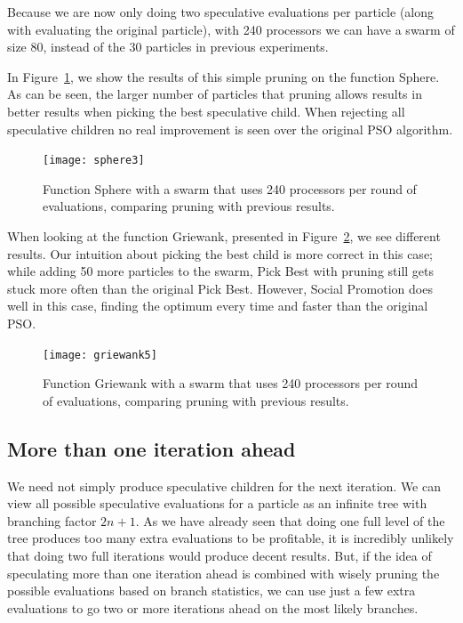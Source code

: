 \documentclass[journal,letterpaper]{IEEEtran}
\newcommand{\fig}[1]{Figure~\ref{fig:#1}}
\begin{document}
Because we are now only doing two speculative evaluations per particle (along
with evaluating the original particle), with 240 processors we can have a swarm
of size 80, instead of the 30 particles in previous experiments.  

In \fig{sphere-pruned}, we show the results of this simple pruning on the
function Sphere.  As can be seen, the larger number of particles that pruning
allows results in better results when picking the best speculative child.  
When rejecting all speculative children no real improvement is seen over the
original PSO algorithm.

\begin{figure}
  \centering
  \texttt{[image: sphere3]}
  \caption{Function Sphere with a swarm that uses 240 processors per round of
  evaluations, comparing pruning with previous results.}
  \label{fig:sphere-pruned}
\end{figure}

When looking at the function Griewank, presented in \fig{griewank-pruned}, we
see different results.  Our intuition about picking the best child is more
correct in this case; while adding 50 more particles to the swarm, Pick Best
with pruning still gets stuck more often than the original Pick Best.  However,
Social Promotion does well in this case, finding the optimum every time and
faster than the original PSO.

\begin{figure}
  \centering
  \texttt{[image: griewank5]}
  \caption{Function Griewank with a swarm that uses 240 processors per round of
  evaluations, comparing pruning with previous results.}
  \label{fig:griewank-pruned}
\end{figure}

\subsection{More than one iteration ahead}
\label{sec:manyiters}

We need not simply produce speculative children for the next iteration.  We can
view all possible speculative evaluations for a particle as an infinite tree
with branching factor $2n+1$.  As we have already seen that doing one full
level of the tree produces too many extra evaluations to be profitable, it is
incredibly unlikely that doing two full iterations would produce decent
results.  But, if the idea of speculating more than one iteration ahead is
combined with wisely pruning the possible evaluations based on branch
statistics, we can use just a few extra evaluations to go two or more
iterations ahead on the most likely branches.
\end{document}
